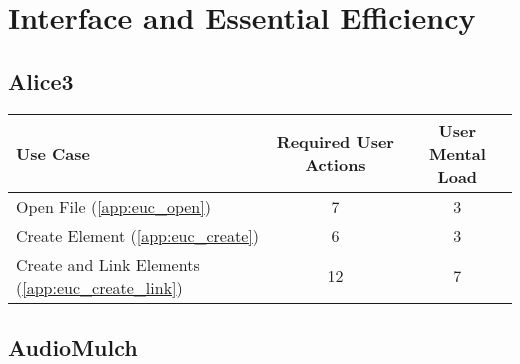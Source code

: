 \section{Interface and Essential Efficiency}

\subsection*{Alice3}




\begin{tabularx}{\textwidth}{Xcc}
\textbf{Use Case} & \textbf{Required User Actions} & \textbf{User Mental Load}\\
\hline
Open File (\ref{app:euc_open})                       & 7  & 3 \\
Create Element (\ref{app:euc_create})                & 6  & 3 \\
Create and Link Elements (\ref{app:euc_create_link}) & 12 & 7
\end{tabularx}

\subsection*{AudioMulch}


